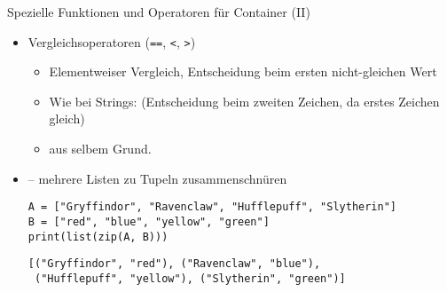 
\begin{frame}[fragile]{Spezielle Funktionen und Operatoren für Container (II)}
%
\begin{itemize}
\item Vergleichsoperatoren (\texttt{==}, \texttt{<}, \texttt{>})
	\begin{itemize}
	\item Elementweiser Vergleich, Entscheidung beim ersten nicht-gleichen Wert
	\item Wie bei Strings:  (Entscheidung beim zweiten Zeichen, da erstes Zeichen gleich)
	\item \inPy{[1, 5, 7] < [1, 5, 9, -3]} aus selbem Grund.
	\end{itemize}
\item {} -- mehrere Listen zu Tupeln zusammenschnüren\\
	\begin{codebox}
	\begin{verbatim}
A = ["Gryffindor", "Ravenclaw", "Hufflepuff", "Slytherin"]
B = ["red", "blue", "yellow", "green"]
print(list(zip(A, B)))
	\end{verbatim}
	\end{codebox}
	\begin{cmdbox}
	\begin{verbatim}
[("Gryffindor", "red"), ("Ravenclaw", "blue"),
 ("Hufflepuff", "yellow"), ("Slytherin", "green")]
	\end{verbatim}
	\end{cmdbox}
\end{itemize}
%
\end{frame}